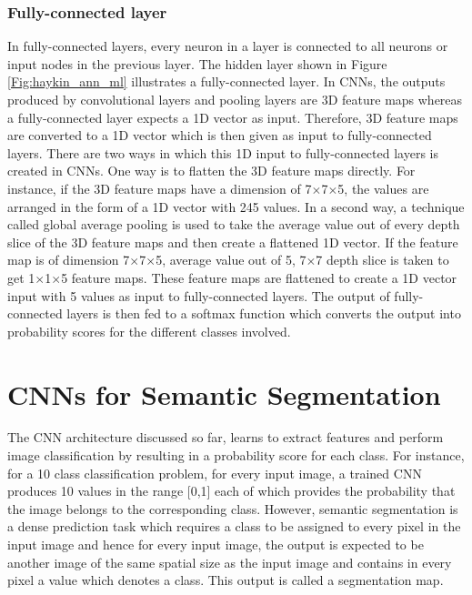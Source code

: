 \subsubsection{Fully-connected layer}

In fully-connected layers, every neuron in a layer is connected to all neurons or input nodes in the previous layer. The hidden layer shown in Figure \ref{Fig:haykin_ann_ml} illustrates a fully-connected layer. In CNNs, the outputs produced by convolutional layers and pooling layers are 3D feature maps whereas a fully-connected layer expects a 1D vector as input. Therefore, 3D feature maps are converted to a 1D vector which is then given as input to fully-connected layers. There are two ways in which this 1D input to fully-connected layers is created in CNNs. One way is to flatten the 3D feature maps directly. For instance, if the 3D feature maps have a dimension of 7$\times$7$\times$5, the values are arranged in the form of a 1D vector with 245 values. In a second way, a technique called global average pooling is used to take the average value out of every depth slice of the 3D feature maps and then create a flattened 1D vector. If the feature map is of dimension 7$\times$7$\times$5, average value out of 5, 7$\times$7 depth slice is taken to get 1$\times$1$\times$5 feature maps. These feature maps are flattened to create a 1D vector input with 5 values as input to fully-connected layers. The output of fully-connected layers is then fed to a softmax function which converts the output into probability scores for the different classes involved.

\section{CNNs for Semantic Segmentation}
\label{section:cnnseg}

The CNN architecture discussed so far, learns to extract features and perform image classification by resulting in a probability score for each class. For instance, for a 10 class classification problem, for every input image, a trained CNN produces 10 values in the range [0,1] each of which provides the probability that the image belongs to the corresponding class. However, semantic segmentation is a dense prediction task which requires a class to be assigned to every pixel in the input image and hence for every input image, the output is expected to be another image of the same spatial size as the input image and contains in every pixel a value which denotes a class. This output is called a segmentation map. 

